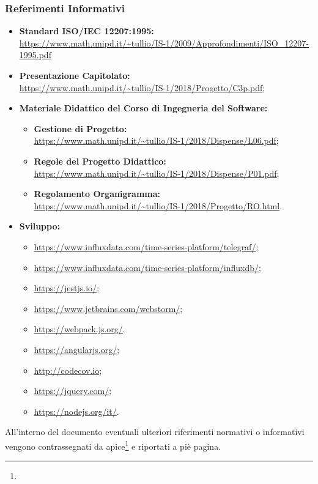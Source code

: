 \subsubsection{Referimenti Informativi}
\begin{itemize}
\item \textbf{Standard ISO/IEC 12207:1995:}\\
\url{https://www.math.unipd.it/~tullio/IS-1/2009/Approfondimenti/ISO_12207-1995.pdf}
\item \textbf{Presentazione Capitolato:}\\ \url{https://www.math.unipd.it/~tullio/IS-1/2018/Progetto/C3p.pdf};
\item \textbf{Materiale Didattico del Corso di Ingegneria del Software:}
	\begin{itemize}
	\item \textbf{Gestione di Progetto:}\\ \url{https://www.math.unipd.it/~tullio/IS-1/2018/Dispense/L06.pdf};
	\item \textbf{Regole del Progetto Didattico:}\\ \url{https://www.math.unipd.it/~tullio/IS-1/2018/Dispense/P01.pdf};
	\item \textbf{Regolamento Organigramma:}\\ \url{https://www.math.unipd.it/~tullio/IS-1/2018/Progetto/RO.html}.
	\end{itemize}
	\item \textbf{Sviluppo:}
	\begin{itemize}
	\item \url{https://www.influxdata.com/time-series-platform/telegraf/};
	\item \url{https://www.influxdata.com/time-series-platform/influxdb/};
	\item \url{https://jestjs.io/};
	\item \url{https://www.jetbrains.com/webstorm/};
	\item \url{https://webpack.js.org/}.
	\item \url{https://angularjs.org/};
	\item \url{http://codecov.io};
	\item \url{https://jquery.com/};
	\item \url{https://nodejs.org/it/}.
	\end{itemize}

\end{itemize}

All'interno del documento eventuali ulteriori riferimenti normativi o informativi vengono contrassegnati da apice\footnote{} e riportati a piè pagina.
